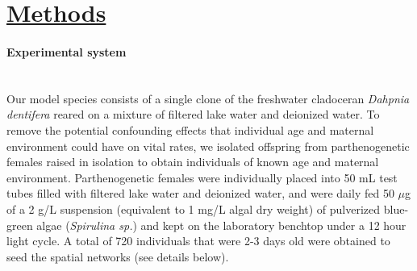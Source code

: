 \section*{\textbf{\underline{Methods}}}

\paragraph*{Experimental system}\mbox{}\\
Our model species consists of a single clone of the freshwater cladoceran \textit{Dahpnia dentifera} reared on a mixture of filtered lake water and deionized water. To remove the potential confounding effects that individual age and maternal environment could have on vital rates, we isolated offspring from parthenogenetic females raised in isolation to obtain individuals of known age and maternal environment. Parthenogenetic females were individually placed into 50 mL test tubes filled with filtered lake water and deionized water, and were daily fed 50 $\mu$g  of a 2 g/L suspension (equivalent to 1 mg/L algal dry weight) of pulverized blue-green algae (\textit{Spirulina sp.}) and kept on the laboratory benchtop under a 12 hour light cycle. A total of 720 individuals that were 2-3 days old were obtained to seed the spatial networks (see details below).



